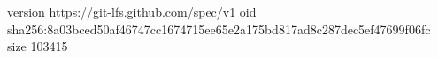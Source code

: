 version https://git-lfs.github.com/spec/v1
oid sha256:8a03bced50af46747cc1674715ee65e2a175bd817ad8c287dec5ef47699f06fc
size 103415

